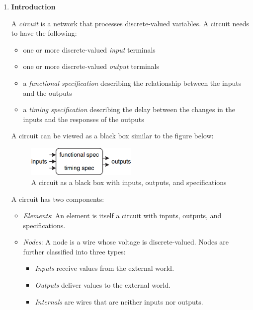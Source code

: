 \documentclass[12pt]{article}
\begin{document}
\begin{enumerate}
    \item \textbf{Introduction}

    A \textit{circuit} is a network that processes discrete-valued variables. A circuit needs to have the following:

    \begin{itemize}
        \item one or more discrete-valued \textit{input} terminals
        \item one or more discrete-valued \textit{output} terminals
        \item a \textit{functional specification} describing the relationship between the inputs and the outputs
        \item a \textit{timing specification} describing the delay between the changes in the inputs and the responses of the outputs
    \end{itemize}

    A circuit can be viewed as a black box similar to the figure below:

    \begin{figure}[h]
        \centering
        \includegraphics[width=0.5\textwidth]{circuit.png}
        \caption{A circuit as a black box with inputs, outputs, and specifications}
        \label{Figure 2.1}
    \end{figure}

    \newpage

    A circuit has two components:

    \begin{itemize}
        \item \textit{Elements}: An element is itself a circuit with inputs, outputs, and specifications.
        \item \textit{Nodes}: A node is a wire whose voltage is discrete-valued. Nodes are further classified into three types:
        \begin{itemize}
            \item \textit{Inputs} receive values from the external world.
            \item \textit{Outputs} deliver values to the external world.
            \item \textit{Internals} are wires that are neither inputs nor outputs.
        \end{itemize}
    \end{itemize}


\end{enumerate}
\end{document}
